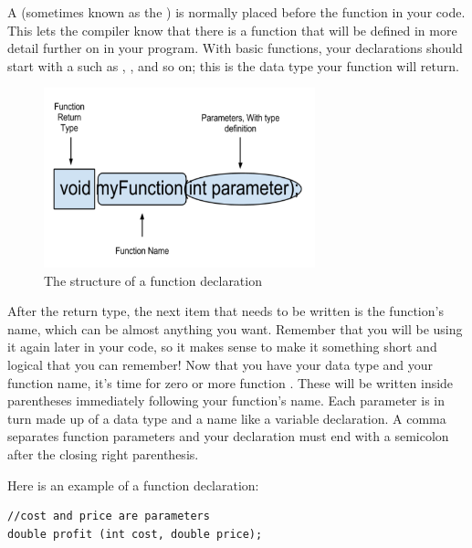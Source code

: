 A  (sometimes known as the ) is normally placed before the  function in your code. 
This lets the compiler know that there is a function that will be defined in more detail further on in your program. 
With basic functions, your declarations should start with a  such as , , and so on; this is the data type your function will return. 

\begin{figure}[tb]
  \centering
  \includegraphics[width=0.7\textwidth]{diagrams/function_structure_diagram_1.pdf}
  \caption{The structure of a function declaration} \label{fig:function_structure_diagram_1} 
\end{figure}

After the return type, the next item that needs to be written is the function's name, which can be almost anything you want. 
Remember that you will be using it again later in your code, so it makes sense to make it something short and logical that you can remember! 
Now that you have your data type and your function name, it's time for zero or more function . 
These will be written inside parentheses immediately following your function's name. 
Each parameter is in turn made up of a data type and a name like a variable declaration. 
A comma separates function parameters and your declaration must end with a semicolon after the closing right parenthesis.

Here is an example of a function declaration:

\noindent\begin{minipage}{\linewidth}\begin{lstlisting}
//cost and price are parameters
double profit (int cost, double price); 
\end{lstlisting}\end{minipage}
        	
